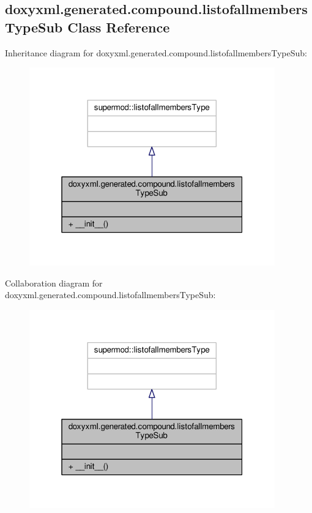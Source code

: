 \subsection{doxyxml.\+generated.\+compound.\+listofallmembers\+Type\+Sub Class Reference}
\label{classdoxyxml_1_1generated_1_1compound_1_1listofallmembersTypeSub}


Inheritance diagram for doxyxml.\+generated.\+compound.\+listofallmembers\+Type\+Sub\+:
\nopagebreak
\begin{figure}[H]
\begin{center}
\leavevmode
\includegraphics[width=301pt]{dd/d4e/classdoxyxml_1_1generated_1_1compound_1_1listofallmembersTypeSub__inherit__graph}
\end{center}
\end{figure}


Collaboration diagram for doxyxml.\+generated.\+compound.\+listofallmembers\+Type\+Sub\+:
\nopagebreak
\begin{figure}[H]
\begin{center}
\leavevmode
\includegraphics[width=301pt]{dc/db9/classdoxyxml_1_1generated_1_1compound_1_1listofallmembersTypeSub__coll__graph}
\end{center}
\end{figure}
